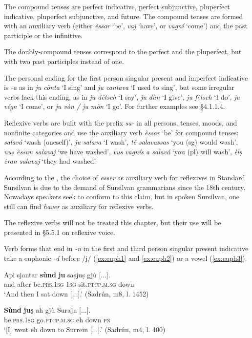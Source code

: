 The compound tenses are perfect indicative, perfect subjunctive, pluperfect indicative,  pluperfect subjunctive, and future. The compound tenses are formed with an auxiliary verb (either \textit{èssar} `be', \textit{vaj} `have', or \textit{vagní} `come') and the past participle or the infinitive. 

The doubly-compound tenses correspond to the perfect and the pluperfect, but with two past participles instead of one.

The personal ending for the first person singular present and imperfect indicative is \textit{-a} as in \textit{ju cònta} `I sing' and \textit{ju cantava} `I used to sing', but some irregular verbs lack this ending, as in  \textit{ju détsch} `I say', \textit{ju dùn} `I give', \textit{ju fétsch} `I do', \textit{ju végn} `I come', or \textit{ju vòn / ju mòn} `I go'. For further examples see §4.1.1.4.

Reflexive verbs are built with the prefix \textit{sa-} in all persons, tenses, moods, and nonfinite categories and use the auxiliary verb \textit{èssar} `be' for compound tenses: \textit{salavá} `wash (oneself)', \textit{ju salava} `I wash', \textit{té salavassas} `you (sg) would wash', \textit{nus èssan salavaj} `we have washed', \textit{vus vagnís a salavá} `you (pl) will wash', \textit{èlṣ èran salavaj} `they had washed'.

According to the , the choice of \textit{esser} as auxiliary verb for reflexives in Standard Sursilvan is due to the demand of Sursilvan grammarians since the 18th century. Nowadays speakers seek to conform to this claim, but in spoken Sursilvan, one still can find \textit{haver} as auxiliary for reflexive verbs.

The reflexive verbs will not be treated this chapter, but their use will be presented in §5.5.1 on reflexive voice.

Verb forms that end in \textit{-n} in the first and third person singular present indicative take a euphonic \textit{-d} before /j/ (\ref{ex:euph1} and \ref{ex:euph2}) or a vowel (\ref{ex:euph3}).

\ea
\label{ex:euph1}
\gll  Api sjantar \textbf{sùnd} \textbf{ju} saṣjuṣ gjù [...].\\
and after be.\textsc{prs.1sg} \textsc{1sg} sit.\textsc{ptcp.m.sg} down\\
\glt `And then I sat down [...].' (Sadrún, m8, l. 1452)
\z

\ea
\label{ex:euph2}
\gll   \textbf{Sùnd} \textbf{juṣ} ah gjù Surajn [...]. \\
be.\textsc{prs.1sg} go.\textsc{ptcp.m.sg} eh down \textsc{pn}\\
\glt `[I] went eh down to Surrein [...].' (Sadrún, m4, l. 400)
\z

